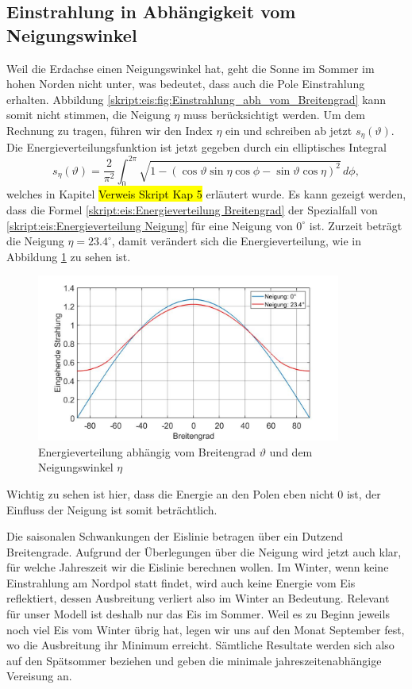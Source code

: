 \begin{refsection}
\subsection{Einstrahlung in Abhängigkeit vom Neigungswinkel}
Weil die Erdachse einen Neigungswinkel hat, geht die Sonne im Sommer im hohen Norden nicht unter, was bedeutet, dass auch die Pole Einstrahlung erhalten. Abbildung \ref{skript:eis:fig:Einstrahlung_abh_vom_Breitengrad} kann somit nicht stimmen, die Neigung $\eta$ muss berücksichtigt werden. Um dem Rechnung zu tragen, führen wir den Index $\eta$ ein und schreiben ab jetzt $s_{\eta}(\vartheta)$. Die Energieverteilungsfunktion ist jetzt gegeben durch ein elliptisches Integral
\begin{equation}\label{skript:eis:Energieverteilung Neigung}
s_{\eta}(\vartheta)
=
\frac{2}{\pi^2}\int_{0}^{2\pi}\sqrt{1-(\cos\vartheta\sin\eta \cos\phi-\sin\vartheta \cos\eta)^2}\,d\phi,
\end{equation}
welches in Kapitel \hl{Verweis Skript Kap 5} erläutert wurde. Es kann gezeigt werden, dass die Formel \eqref{skript:eis:Energieverteilung Breitengrad} der Spezialfall von \eqref{skript:eis:Energieverteilung Neigung} für eine Neigung von $0^{\circ}$ ist. Zurzeit beträgt die Neigung $\eta=23.4^{\circ}$, damit verändert sich die Energieverteilung, wie in Abbildung \ref{skript:eis:fig:Einstrahlung_abh_mit_und_ohne_Neigung} zu sehen ist.
\begin{figure}
	\centering
	\includegraphics[width=10cm]{eis/Einstrahlung_abh_mit_und_ohne_Neigung.jpg}
	\caption{Energieverteilung abhängig vom Breitengrad $\vartheta$ und dem Neigungswinkel $\eta$}
	\label{skript:eis:fig:Einstrahlung_abh_mit_und_ohne_Neigung}
\end{figure}
Wichtig zu sehen ist hier, dass die Energie an den Polen eben nicht $0$ ist, der Einfluss der Neigung ist somit beträchtlich.

Die saisonalen Schwankungen der Eislinie betragen über ein Dutzend Breitengrade. Aufgrund der Überlegungen über die Neigung wird jetzt auch klar, für welche Jahreszeit wir die Eislinie berechnen wollen. Im Winter, wenn keine Einstrahlung am Nordpol statt findet, wird auch keine Energie vom Eis reflektiert, dessen Ausbreitung verliert also im Winter an Bedeutung. Relevant für unser Modell ist deshalb nur das Eis im Sommer. Weil es zu Beginn jeweils noch viel Eis vom Winter übrig hat, legen wir uns auf den Monat September fest, wo die Ausbreitung ihr Minimum erreicht. Sämtliche Resultate werden sich also auf den Spätsommer beziehen und geben die minimale jahreszeitenabhängige Vereisung an.

\end{refsection}
